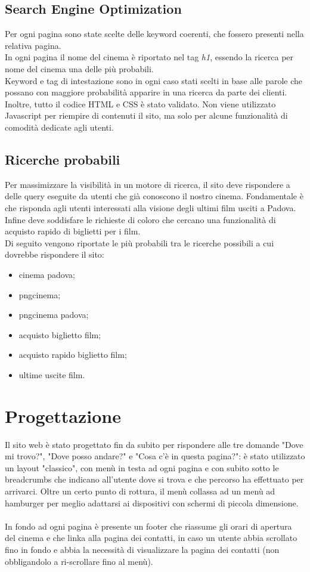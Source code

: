 \documentclass[a4paper, 12pt]{article}
\begin{document}
\subsection{Search Engine Optimization}
Per ogni pagina sono state scelte delle keyword coerenti, che fossero presenti nella relativa pagina.\\
In ogni pagina il nome del cinema è riportato nel tag \textit{h1}, essendo la ricerca per nome del cinema una delle più probabili.\\
Keyword e tag di intestazione sono in ogni caso stati scelti in base alle parole che possano con maggiore probabilità apparire in una ricerca da parte dei clienti.
Inoltre, tutto il codice HTML e CSS è stato validato.
Non viene utilizzato Javascript per riempire di contenuti il sito, ma solo per alcune funzionalità di comodità dedicate agli utenti.

\subsection{Ricerche probabili}
Per massimizzare la visibilità in un motore di ricerca, il sito deve rispondere a delle query eseguite da utenti che già conoscono il nostro cinema. 
Fondamentale è che risponda agli utenti interessati alla visione degli ultimi film usciti a Padova. Infine deve soddisfare le richieste di coloro che cercano una funzionalità di acquisto rapido di biglietti per i film.\\
Di seguito vengono riportate le più probabili tra le ricerche possibili a cui dovrebbe rispondere il sito:

\begin{itemize}
\item cinema padova; 
\item pngcinema;
\item pngcinema padova;
\item acquisto biglietto film;
\item acquisto rapido biglietto film;
\item ultime uscite film.
\end{itemize}

\newpage

\section{Progettazione}
Il sito web è stato progettato fin da subito per rispondere alle tre domande "Dove mi trovo?", "Dove posso andare?" e "Cosa c'è in questa pagina?": è stato utilizzato un layout "classico", con menù in testa ad ogni pagina e con subito sotto le breadcrumbs che indicano all'utente dove si trova e che percorso ha effettuato per arrivarci. Oltre un certo punto di rottura, il menù collassa ad un menù ad hamburger per meglio adattarsi ai dispositivi con schermi di piccola dimensione.\\
\\In fondo ad ogni pagina è presente un footer che riassume gli orari di apertura del cinema e che linka alla pagina dei contatti, in caso un utente abbia scrollato fino in fondo e abbia la necessità di visualizzare la pagina dei contatti (non obbligandolo a ri-scrollare fino al menù).
\end{document}
